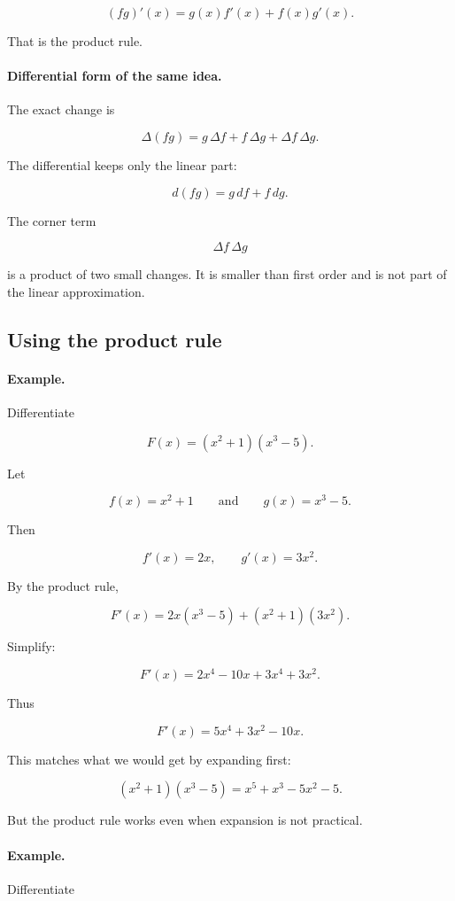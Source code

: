 \[
(fg)'(x)=g(x)f'(x)+f(x)g'(x).
\]

That is the product rule.

\paragraph{Differential form of the same idea.}
The exact change is

\[
\Delta(fg)=g\,\Delta f+f\,\Delta g+\Delta f\,\Delta g.
\]

The differential keeps only the linear part:

\[
\boxed{
d(fg)=g\,df+f\,dg.
}
\]

The corner term

\[
\Delta f\,\Delta g
\]

is a product of two small changes.  It is smaller than first order and is not part of the linear approximation.

\subsection{Using the product rule}
\label{subsec:using-product-rule}

\paragraph{Example.}
Differentiate

\[
F(x)=(x^2+1)(x^3-5).
\]

Let

\[
f(x)=x^2+1
\qquad\text{and}\qquad
g(x)=x^3-5.
\]

Then

\[
f'(x)=2x,
\qquad
g'(x)=3x^2.
\]

By the product rule,

\[
F'(x)=2x(x^3-5)+(x^2+1)(3x^2).
\]

Simplify:

\[
F'(x)=2x^4-10x+3x^4+3x^2.
\]

Thus

\[
\boxed{
F'(x)=5x^4+3x^2-10x.
}
\]

This matches what we would get by expanding first:

\[
(x^2+1)(x^3-5)=x^5+x^3-5x^2-5.
\]

But the product rule works even when expansion is not practical.

\paragraph{Example.}
Differentiate

